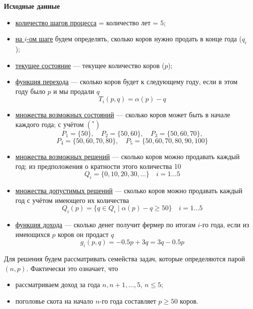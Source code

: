 \bigskip

\textbf{Исходные данные}

\begin{itemize}[nosep]
	\item \underline{количество шагов процесса} = количество лет = $5$;
	
	\item \underline{на $i$-ом шаге} будем определять, сколько коров нужно продать в конце года ($q_i$);
	
	\item \underline{текущее состояние} --- текущее количество коров ($p$);
	
	\item \underline{функция перехода} --- сколько коров будет к следующему году, если в этом году было $p$ и мы продали $q$
	\[T_i(p, q) = \alpha(p) - q\]
	
	\item \underline{множества возможных состояний} --- сколько коров может быть в начале каждого года; с учётом $(^*)$
	\[
	P_1 = \{50\}, \quad P_2 = \{50, 60\}, \quad P_3 = \{50, 60, 70\},
	\]
	\[
	P_4 = \{50, 60, 70, 80\}, \quad P_5 = \{50, 60, 70, 80, 90, 100\}
	\]
	
	\item \underline{множества возможных решений} --- сколько коров можно продавать каждый год; из предположения о кратности этого количества 10
	\[
	Q_i = \{0, 10, 20, 30, \dots\} \quad i = 1 \dots 5
	\]
	
	\item \underline{множества допустимых решений} --- сколько коров можно продавать каждый год с учётом имеющего их количества
	\[
	Q_i(p) = \{q \in Q_i \; \big| \; \alpha(p) - q \ge 50\} \quad i = 1 \dots 5
	\]
	
	\item \underline{функция дохода} --- сколько денег получит фермер по итогам $i$-го года, если из имеющихся $p$ коров он продаст $q$
	\[g_i(p, q) = -0.5p + 3q = 3q - 0.5p\]
\end{itemize}

Для решения будем рассматривать семейства задач, которые определяются парой $(n, p)$. Фактически это означает, что
\begin{itemize}[nosep]
	\item рассматриваем доход за года $n, n+1, \dots, 5$, $n \le 5$;
	
	\item поголовье скота на начало $n$-го года составляет $p \ge 50$ коров.
\end{itemize}


